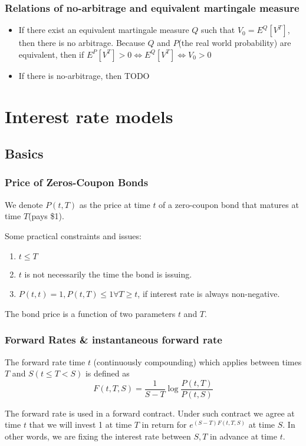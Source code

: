 \documentclass[a4paper,13pt]{report}
\begin{document}
\subsection{Relations of no-arbitrage and equivalent martingale measure}
\begin{itemize}
    \item If there exist an equivalent martingale measure $Q$ such that $V_0 = E^Q[V^T]$, then there is no arbitrage. Because $Q$ and $P$(the real world probability) are equivalent, then if $E^P[V^T]>0 \Leftrightarrow E^Q[V^T] \Leftrightarrow V_0 >0 $
    \item If there is no-arbitrage, then TODO
\end{itemize}

\chapter{Interest rate models}
\section{Basics}
\subsection{Price of Zeros-Coupon Bonds}
We denote $P(t,T)$ as the price at time $t$ of a zero-coupon bond that matures at time $T$(pays \$1).

Some practical constraints and issues: 
\begin{enumerate}
    \item $t \leq T$
    \item $t$ is not necessarily the time the bond is issuing. 
    \item $P(t,t)=1, P(t,T) \leq 1 \forall T\geq t$, if interest rate is always non-negative. 
\end{enumerate}

The bond price is a function of two parameters $t$ and $T$.

\subsection{Forward Rates \& instantaneous forward rate}
The forward rate time $t$ (continuously compounding) which applies between times $T$ and $S (t\leq T < S)$ is defined as
$$F(t,T,S) = \frac{1}{S-T}\log \frac{P(t,T)}{P(t,S)}$$

The forward rate is used in a forward contract. Under such contract we agree at time $t$ that we will invest 1 at time $T$ in return for $e^{(S-T)F(t,T,S)}$ at time $S$. In other words, we are fixing the interest rate between $S,T$ in advance at time $t$.
\end{document}
